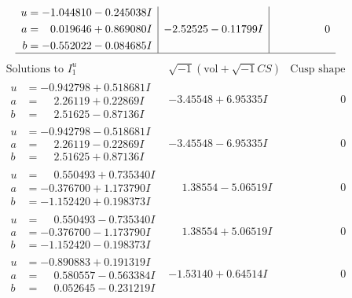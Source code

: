 \documentclass[1p]{elsarticle_modified}
\theoremstyle{definition}
\newcommand{\I}{\sqrt{-1}}
\begin{document}
$$\begin{array}{c|c|c}
\begin{aligned}
u &= -1.044810 - 0.245038 I \\
a &= \phantom{-}0.019646 + 0.869080 I \\
b &= -0.552022 - 0.084685 I\end{aligned}
 & -2.52525 - 0.11799 I & \phantom{-0.000000 } 0\\
 \hline 
 \end{array}$$\newpage$$\begin{array}{c|c|c}  
\text{Solutions to }I^u_{1}& \I (\text{vol} + \sqrt{-1}CS) & \text{Cusp shape}\\
 \hline 
\begin{aligned}
u &= -0.942798 + 0.518681 I \\
a &= \phantom{-}2.26119 + 0.22869 I \\
b &= \phantom{-}2.51625 - 0.87136 I\end{aligned}
 & -3.45548 + 6.95335 I & \phantom{-0.000000 } 0 \\ \hline\begin{aligned}
u &= -0.942798 - 0.518681 I \\
a &= \phantom{-}2.26119 - 0.22869 I \\
b &= \phantom{-}2.51625 + 0.87136 I\end{aligned}
 & -3.45548 - 6.95335 I & \phantom{-0.000000 } 0 \\ \hline\begin{aligned}
u &= \phantom{-}0.550493 + 0.735340 I \\
a &= -0.376700 + 1.173790 I \\
b &= -1.152420 + 0.198373 I\end{aligned}
 & \phantom{-}1.38554 - 5.06519 I & \phantom{-0.000000 } 0 \\ \hline\begin{aligned}
u &= \phantom{-}0.550493 - 0.735340 I \\
a &= -0.376700 - 1.173790 I \\
b &= -1.152420 - 0.198373 I\end{aligned}
 & \phantom{-}1.38554 + 5.06519 I & \phantom{-0.000000 } 0 \\ \hline\begin{aligned}
u &= -0.890883 + 0.191319 I \\
a &= \phantom{-}0.580557 - 0.563384 I \\
b &= \phantom{-}0.052645 - 0.231219 I\end{aligned}
 & -1.53140 + 0.64514 I & \phantom{-0.000000 } 0 \\ \hline\begin{aligned}

\end{aligned}
\end{array}$$
\end{document}
